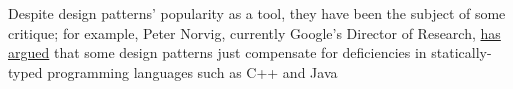 Despite design patterns' popularity as a tool,
they have been the subject of some critique; for example, Peter
Norvig, currently Google's Director of Research,
\href{http://www.norvig.com/design-patterns}{has argued} that some design
patterns just compensate for deficiencies in statically-typed
programming languages such as C++ and Java